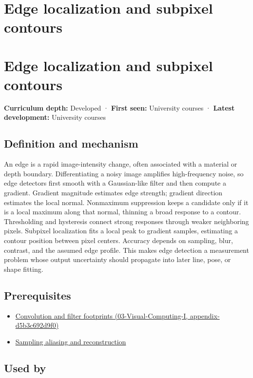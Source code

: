 \hypertarget{appendix-36022286b03e}{}
\section*{Edge localization and subpixel contours}
\section{Edge localization and subpixel contours}\label{edge-localization-and-subpixel-contours}

\textbf{Curriculum depth:} Developed · \textbf{First seen:} University courses · \textbf{Latest development:} University courses

\subsection{Definition and mechanism}\label{definition-and-mechanism}

An edge is a rapid image-intensity change, often associated with a material or depth boundary. Differentiating a noisy image amplifies high-frequency noise, so edge detectors first smooth with a Gaussian-like filter and then compute a gradient. Gradient magnitude estimates edge strength; gradient direction estimates the local normal. Nonmaximum suppression keeps a candidate only if it is a local maximum along that normal, thinning a broad response to a contour. Thresholding and hysteresis connect strong responses through weaker neighboring pixels. Subpixel localization fits a local peak to gradient samples, estimating a contour position between pixel centers. Accuracy depends on sampling, blur, contrast, and the assumed edge profile. This makes edge detection a measurement problem whose output uncertainty should propagate into later line, pose, or shape fitting.

\subsection{Prerequisites}\label{prerequisites}

\begin{itemize}
\tightlist
\item
  \href{}{Convolution and filter footprints (03-Visual-Computing-I, appendix-d5b3c692d9f0)}
\item
  \hyperref[appendix-6a7869dd79a6]{Sampling aliasing and reconstruction}
\end{itemize}

\subsection{Used by}\label{used-by}

